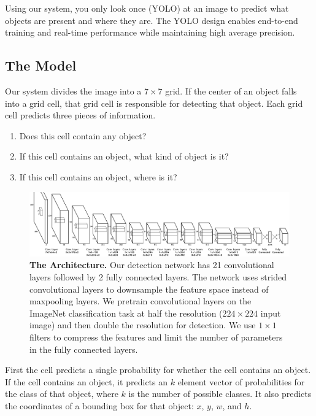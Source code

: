 \documentclass{article} %
\begin{document}
Using our system, you only look once (YOLO) at an image to predict what objects are present and where they are. The YOLO design enables end-to-end training and real-time performance while maintaining high average precision.

\subsection{The Model}

Our system divides the image into a $7 \times 7$ grid. If the center of an object falls into a grid cell, that grid cell is responsible for detecting that object. Each grid cell predicts three pieces of information.

\begin{enumerate}
    \item Does this cell contain any object?
    \item If this cell contains an object, what kind of object is it?
    \item If this cell contains an object, where is it?
\end{enumerate}

   \begin{figure}[hbtp]
      \centering
        \includegraphics[width=\linewidth]{detectnet}
      \caption{\textbf{The Architecture.} Our detection network has 21 convolutional layers followed by 2 fully connected layers. The network uses strided convolutional layers to downsample the feature space instead of maxpooling layers. We pretrain convolutional layers on the ImageNet classification task at half the resolution ($224 \times 224$ input image) and then double the resolution for detection. We use $1 \times 1$ filters to compress the features and limit the number of parameters in the fully connected layers.}
      \label{net}
   \end{figure}


First the cell predicts a single probability for whether the cell contains an object. If the cell contains an object, it predicts an $k$ element vector of probabilities for the class of that object, where $k$ is the number of possible classes. It also predicts the coordinates of a bounding box for that object: $x$, $y$, $w$, and $h$.
\end{document}
